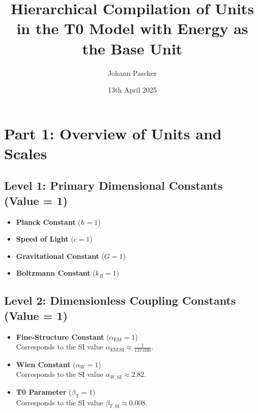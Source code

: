 \documentclass[12pt,a4paper]{article}
\newcommand{\alphaEM}{\alpha_{\text{EM}}}
\newcommand{\betaT}{\beta_{\text{T}}}
\newcommand{\alphaEMSI}{\alpha_{\text{EM,SI}}}
\begin{document}
	
	\title{Hierarchical Compilation of Units in the T0 Model with Energy as the Base Unit}
	\author{Johann Pascher}
	\date{13th April 2025}
	\maketitle
	
	\section*{Part 1: Overview of Units and Scales}
	
	\subsection*{Level 1: Primary Dimensional Constants (Value = 1)}
	\begin{itemize}[itemsep=0.5em]
		\item \textbf{Planck Constant} ($\hbar = 1$)
		\item \textbf{Speed of Light} ($c = 1$)
		\item \textbf{Gravitational Constant} ($G = 1$)
		\item \textbf{Boltzmann Constant} ($k_B = 1$)
	\end{itemize}
	
	\subsection*{Level 2: Dimensionless Coupling Constants (Value = 1)}
	\begin{itemize}[itemsep=0.5em]
		\item \textbf{Fine-Structure Constant} (\(\alphaEM = 1\)) \\
		Corresponds to the SI value \(\alphaEMSI \approx \frac{1}{137.036}\).
		\item \textbf{Wien Constant} (\(\alpha_W = 1\)) \\
		Corresponds to the SI value \(\alpha_{W,\mathrm{SI}} \approx 2.82\).
		\item \textbf{T0 Parameter} (\(\betaT = 1\)) \\
		Corresponds to the SI value \(\beta_{T,\mathrm{SI}} \approx 0.008\).
	\end{itemize}
	
\end{document}
